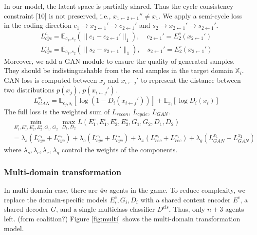 \documentclass{article}
\begin{document}
In our model, the latent space is partially shared. Thus the cycle consistency constraint [10] is not preserved, i.e., $x_{1\leftarrow2\leftarrow1}'' \neq x_1$. We apply a semi-cycle loss in the coding direction $c_1 \rightarrow x_{2\leftarrow1}' \rightarrow c_{2\leftarrow1}'$ and $s_2 \rightarrow x_{2\leftarrow1}' \rightarrow s_{2\leftarrow1}'$.
\begin{equation}
\begin{aligned}
L_{cyc}^{c_1} = \mathbb{E}_{c_1, s_2} (\| c_1 - c_{2\leftarrow1}' \|_1), \quad c_{2\leftarrow1}'=E_2^c(x_{2\leftarrow1}') \\
L_{cyc}^{s_2} = \mathbb{E}_{c_1, s_2} (\| s_2 - s_{2\leftarrow1}' \|_1), \quad s_{2\leftarrow1}'=E_2^s(x_{2\leftarrow1}')
\end{aligned}
\end{equation}
Moreover, we add a GAN module to ensure the quality of generated samples. They should be indistinguishable from the real samples in the target domain $\mathbb{X}_i$. GAN loss is computed between $x_j$ and $x_{i\leftarrow j}'$ to represent the distance between two distributions $p(x_j)$, $p(x_{i\leftarrow j}')$.
\begin{equation}
L_{GAN}^{x_i} = \mathbb{E}_{c_j, s_i}[\log(1-D_i(x_{i\leftarrow j}'))] + \mathbb{E}_{x_i}[\log D_i(x_i)]
\end{equation}
The full loss is the weighted sum of $L_{recon}$, $L_{cycle}$, $L_{GAN}$.
\begin{equation}
\begin{aligned}
&\min_{E_1^c,E_1^s,E_2^c,E_2^s, G_1,G_2}\max_{D_1,D_2} L(E_1^c, E_1^s, E_2^c, E_2^s, G_1, G_2, D_1, D_2) \\
&= \lambda_s (L_{cyc}^{s_1} + L_{cyc}^{s_2}) + \lambda_c (L_{cyc}^{c_1} + L_{cyc}^{c_2}) + \lambda_x (L_{rec}^{x_1} + L_{rec}^{x_2}) + \lambda_g (L_{GAN}^{x_1} + L_{GAN}^{x_2})
\end{aligned}
\end{equation}
where $\lambda_s, \lambda_c, \lambda_x, \lambda_g$ control the weights of the components.


\subsubsection{Multi-domain transformation}
In multi-domain case, there are $4n$ agents in the game. To reduce complexity, we replace the domain-specific models $E^c_i, G_i, D_i$ with a shared content encoder $E^c$, a shared decoder $G$, and a single multiclass classifier $D^{cls}$. Thus, only $n+3$ agents left. {\color{blue} (form coalition?)} Figure \ref{fig:multi} shows the multi-domain transformation model.
\end{document}
